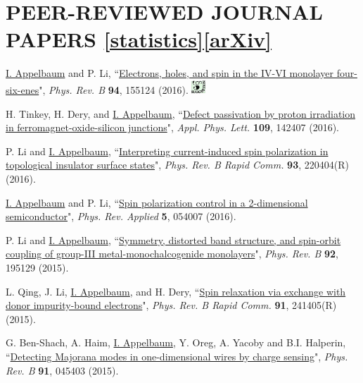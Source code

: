 \documentclass[paper=letter,fontsize=11pt]{scrartcl} %
\newcommand{\NewPart}[2]{\section*{\uppercase{#1} #2}}
\newcommand{\PaperEntry}[7]{
		\noindent #1, ``\href{#7}{#2}", \textit{#3} \textbf{#4}, #5 (#6).}
\begin{document}
\newpage





\NewPart{Peer-Reviewed Journal Papers}{\href{http://scholar.google.com/citations?hl=en&user=1z6xR14AAAAJ}{[statistics]}\href{http://arxiv.org/find/cond-mat/1/au:+Appelbaum_I/0/1/0/all/0/1}{[arXiv]}}

\begin{etaremune}

\item \PaperEntry{\underline{I. Appelbaum} and P. Li}{Electrons, holes, and spin in the IV-VI monolayer four-six-enes}{Phys. Rev. B}{94}{155124}{2016}{http://link.aps.org/doi/10.1103/PhysRevB.94.155124} \includegraphics[width=0.2in]{sug.pdf} 

\item \PaperEntry{H. Tinkey, H. Dery, and \underline{I. Appelbaum}}{Defect passivation by proton irradiation in ferromagnet-oxide-silicon junctions}{Appl. Phys. Lett.}{109}{142407}{2016}{http://dx.doi.org/10.1063/1.4964344}
	
\item \PaperEntry{P. Li and \underline{I. Appelbaum}}{Interpreting current-induced spin polarization in topological insulator surface states}{Phys. Rev. B Rapid Comm.}{93}{220404(R)}{2016}{http://journals.aps.org/prb/abstract/10.1103/PhysRevB.93.220404}

\item \PaperEntry{\underline{I. Appelbaum} and P. Li}{Spin polarization control in a 2-dimensional semiconductor}{Phys. Rev. Applied}{5}{054007}{2016}{http://dx.doi.org/10.1103/PhysRevApplied.5.054007}

\item \PaperEntry{P. Li and \underline{I. Appelbaum}}{Symmetry, distorted band structure, and spin-orbit coupling of group-III metal-monochalcogenide monolayers}{Phys. Rev. B}{92}{195129}{2015}
{http://dx.doi.org/10.1103/PhysRevB.92.195129}

\item \PaperEntry{L. Qing, J. Li, \underline{I. Appelbaum}, and H. Dery}{Spin relaxation via exchange with donor impurity-bound electrons}{Phys. Rev. B Rapid Comm.}{91}{241405(R)}{2015}
{http://dx.doi.org/10.1103/PhysRevB.91.241405}

\item \PaperEntry{G. Ben-Shach, A. Haim, \underline{I. Appelbaum}, Y. Oreg, A. Yacoby and B.I. Halperin}{Detecting Majorana modes in one-dimensional wires by charge sensing}{Phys. Rev. B}{91}{045403}{2015}{http://dx.doi.org/10.1103/PhysRevB.91.045403}



\end{etaremune}
\end{document}

